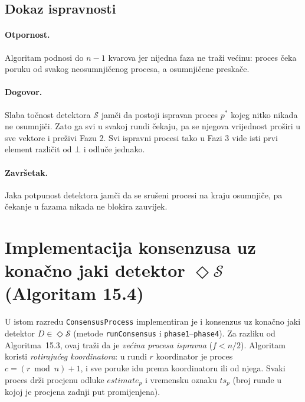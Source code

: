 \documentclass[11pt,a4paper]{article}
\newcommand{\Ds}{\ensuremath{\mathcal{S}}}
\newcommand{\eS}{\ensuremath{\Diamond\mathcal{S}}}
\begin{document}
\subsection{Dokaz ispravnosti}

\paragraph{Otpornost.} Algoritam podnosi do $n-1$ kvarova jer nijedna faza ne
traži većinu: proces čeka poruku od svakog neosumnjičenog procesa, a osumnjičene
preskače.

\paragraph{Dogovor.} Slaba točnost detektora $\Ds$ jamči da postoji ispravan
proces $p^\ast$ kojeg nitko nikada ne osumnjiči. Zato ga svi u svakoj rundi
čekaju, pa se njegova vrijednost proširi u sve vektore i preživi Fazu 2. Svi
ispravni procesi tako u Fazi 3 vide isti prvi element različit od $\bot$ i
odluče jednako.

\paragraph{Završetak.} Jaka potpunost detektora jamči da se srušeni procesi na
kraju osumnjiče, pa čekanje u fazama nikada ne blokira zauvijek.

\section{Implementacija konsenzusa uz konačno jaki detektor \eS{} (Algoritam 15.4)}
\label{sec:kons-es}

U istom razredu \texttt{ConsensusProcess} implementiran je i konsenzus uz konačno
jaki detektor $D \in \eS$ (metode \texttt{runConsensus} i \texttt{phase1}--\texttt{phase4}).
Za razliku od Algoritma~15.3, ovaj traži da je \emph{većina procesa ispravna}
($f < n/2$). Algoritam koristi \emph{rotirajućeg koordinatora}: u rundi $r$
koordinator je proces $c = (r \bmod n) + 1$, i sve poruke idu prema koordinatoru
ili od njega. Svaki proces drži procjenu odluke $estimate_p$ i vremensku oznaku
$ts_p$ (broj runde u kojoj je procjena zadnji put promijenjena).
\end{document}
